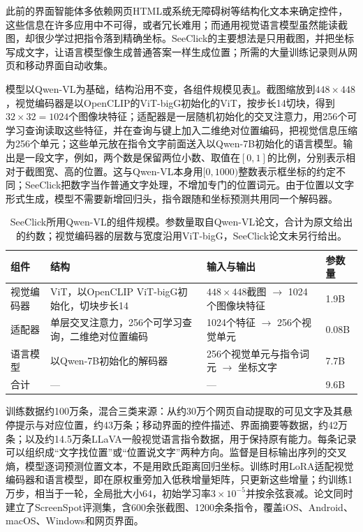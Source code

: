 此前的界面智能体多依赖网页HTML或系统无障碍树等结构化文本来确定控件，这些信息在许多应用中不可得，或者冗长难用；而通用视觉语言模型虽然能读截图，却很少学过把指令落到精确坐标。SeeClick的主要想法是只用截图，并把坐标写成文字，让语言模型像生成普通答案一样生成位置；所需的大量训练记录则从网页和移动界面自动收集。

模型以Qwen-VL为基础，结构沿用不变，各组件规模见表\ref{tab:vision-understanding-seeclick-config}。截图缩放到$448\times448$，视觉编码器是以OpenCLIP的ViT-bigG初始化的ViT，按步长14切块，得到$32\times32=1024$个图像块特征；适配器是一层随机初始化的交叉注意力，用256个可学习查询读取这些特征，并在查询与键上加入二维绝对位置编码，把视觉信息压缩为256个单元；这些单元放在指令文字前面送入以Qwen-7B初始化的语言模型。输出是一段文字，例如，两个数是保留两位小数、取值在$[0,1]$的比例，分别表示相对于截图宽、高的位置。这与Qwen-VL本身用$[0,1000)$整数表示框坐标的约定不同；SeeClick把数字当作普通文字处理，不增加专门的位置词元。由于位置以文字形式生成，模型不需要新增回归头，指令跟随和坐标预测共用同一个解码器。

\begin{table}[htbp]
  \centering
  \small
  \begin{tabularx}{\linewidth}{@{}p{16mm}XXp{12mm}@{}}
    \toprule
    组件 & 结构 & 输入与输出 & 参数量\\
    \midrule
    视觉编码器 & ViT，以OpenCLIP ViT-bigG初始化，切块步长14 & $448\times448$截图 \ensuremath{\to} 1024个图像块特征 & 1.9B\\
    适配器 & 单层交叉注意力，256个可学习查询，二维绝对位置编码 & 1024个特征 \ensuremath{\to} 256个视觉单元 & 0.08B\\
    语言模型 & 以Qwen-7B初始化的解码器 & 256个视觉单元与指令词元 \ensuremath{\to} 坐标文字 & 7.7B\\
    合计 & — & — & 9.6B\\
    \bottomrule
  \end{tabularx}
  \caption{SeeClick所用Qwen-VL的组件规模。参数量取自Qwen-VL论文，合计为原文给出的约数；视觉编码器的层数与宽度沿用ViT-bigG，SeeClick论文未另行给出。}
  \label{tab:vision-understanding-seeclick-config}
\end{table}

训练数据约100万条，混合三类来源：从约30万个网页自动提取的可见文字及其悬停提示与对应位置，约43万条；移动界面的控件描述、界面摘要等数据，约42万条；以及约14.5万条LLaVA一般视觉语言指令数据，用于保持原有能力。每条记录可以组织成“文字找位置”或“位置说文字”两种方向。监督是目标输出序列的交叉熵，模型逐词预测位置文本，不是用欧氏距离回归坐标。训练时用LoRA适配视觉编码器和语言模型，即在原权重旁加入低秩增量矩阵，只更新这些增量；约训练1万步，相当于一轮，全局批大小64，初始学习率$3\times10^{-5}$并按余弦衰减。论文同时建立了ScreenSpot评测集，含600余张截图、1200余条指令，覆盖iOS、Android、macOS、Windows和网页界面。

